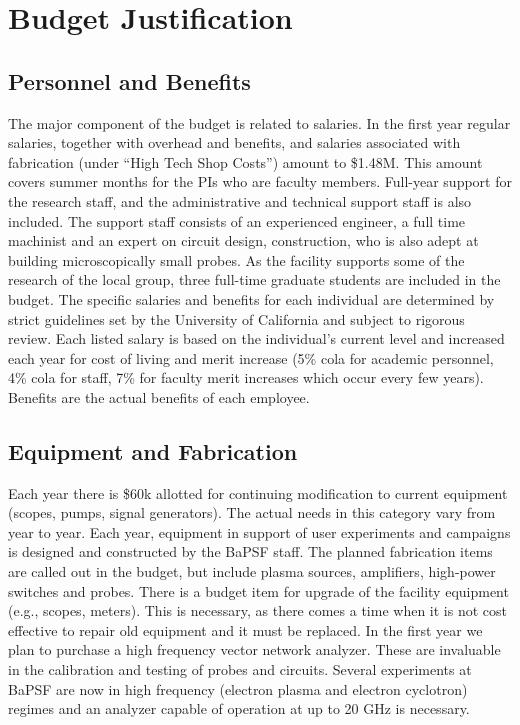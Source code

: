 \documentclass[11pt]{article}
\date{}
\begin{document}
\section*{Budget Justification}

\subsection*{Personnel and Benefits}
The major component of the budget is related to salaries. In the first
year regular salaries, together with overhead and benefits, and
salaries associated with fabrication (under “High Tech Shop Costs”)
amount to \$1.48M. This amount covers summer months for the PIs who are
faculty members. Full-year support for the research staff, and the
administrative and technical support staff is also included. The
support staff consists of an experienced engineer, a full time
machinist and an expert on circuit design, construction, who is also
adept at building microscopically small probes. As the facility
supports some of the research of the local group, three full-time
graduate students are included in the budget.  The specific salaries
and benefits for each individual are determined by strict guidelines
set by the University of California and subject to rigorous
review. Each listed salary is based on the individual’s current level
and increased each year for cost of living and merit increase (5\% cola
for academic personnel, 4\% cola for staff, 7\% for faculty merit
increases which occur every few years). Benefits are the actual
benefits of each employee.  


\subsection*{Equipment and Fabrication}
 Each year there
is \$60k allotted for continuing modification to current equipment
(scopes, pumps, signal generators). The actual needs in this category
vary from year to year.  Each year, equipment in support of
user experiments and campaigns is designed and constructed by the
BaPSF staff. The planned fabrication items are called out in the
budget, but include plasma sources, amplifiers, high-power switches
and probes.  There is a budget item for upgrade of the facility
equipment (e.g., scopes, meters). This is necessary, as there comes a
time when it is not cost effective to repair old equipment and it must
be replaced. In the first year we plan to purchase a high frequency
vector network analyzer. These are invaluable in the calibration and
testing of probes and circuits. Several experiments at BaPSF are now
in high frequency (electron plasma and electron cyclotron) regimes and
an analyzer capable of operation at up to 20 GHz is necessary.  
\end{document}
